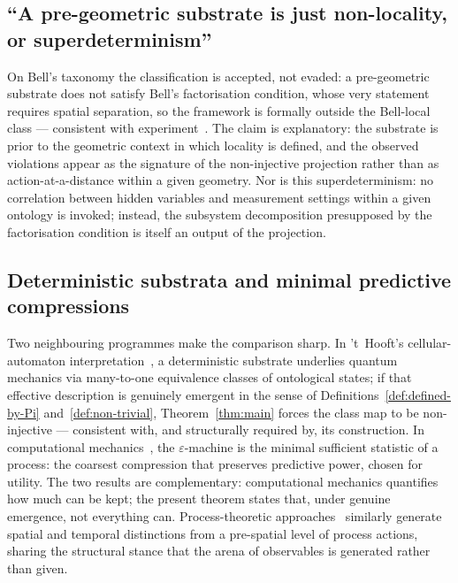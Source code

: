 \documentclass[12pt,a4paper]{article}
\begin{document}
  \subsection*{``A pre-geometric substrate is just non-locality, or superdeterminism''}

    On Bell's taxonomy the classification is accepted, not evaded: a pre-geometric substrate does not satisfy
    Bell's factorisation condition, whose very statement requires spatial separation, so the framework is
    formally outside the Bell-local class --- consistent with experiment~\citep{Beau2026b}.
    The claim is explanatory: the substrate is prior to the geometric context in which locality is defined, and
    the observed violations appear as the signature of the non-injective projection rather than as
    action-at-a-distance within a given geometry.
    Nor is this superdeterminism: no correlation between hidden variables and measurement settings within a
    given ontology is invoked; instead, the subsystem decomposition presupposed by the factorisation condition
    is itself an output of the projection.

  \subsection*{Deterministic substrata and minimal predictive compressions}

    Two neighbouring programmes make the comparison sharp.
    In 't~Hooft's cellular-automaton interpretation~\citep{tHooft2016}, a deterministic substrate underlies
    quantum mechanics via many-to-one equivalence classes of ontological states; if that effective description
    is genuinely emergent in the sense of Definitions~\ref{def:defined-by-Pi} and~\ref{def:non-trivial},
    Theorem~\ref{thm:main} forces the class map to be non-injective --- consistent with, and structurally
    required by, its construction.
    In computational mechanics~\citep{CrutchfieldYoung1989}, the $\varepsilon$-machine is the minimal sufficient
    statistic of a process: the coarsest compression that preserves predictive power, chosen for utility.
    The two results are complementary: computational mechanics quantifies how much can be kept; the present
    theorem states that, under genuine emergence, not everything can.
    Process-theoretic approaches~\citep{Sulis2026} similarly generate spatial and temporal distinctions from a
    pre-spatial level of process actions, sharing the structural stance that the arena of observables is
    generated rather than given.
\end{document}
